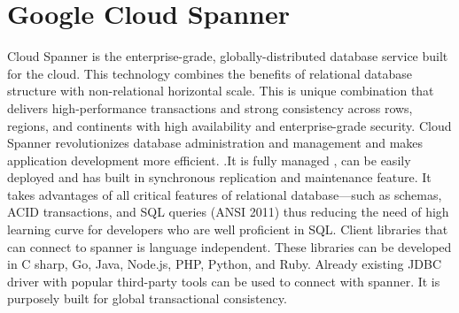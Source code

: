 \section{Google Cloud Spanner}

Cloud Spanner is the enterprise-grade, globally-distributed database service built for the cloud\cite{www-google-spanner}. This technology combines the benefits of relational database structure with non-relational horizontal scale. This is unique combination that delivers high-performance transactions and strong consistency across rows, regions, and continents with high availability and enterprise-grade security\cite{www-google-spanner}. Cloud Spanner revolutionizes database administration and management and makes application development more efficient. \cite{www-google-spanner}.It is fully managed , can be easily deployed and has built in synchronous replication and maintenance feature\cite{www-google-spanner}. It takes advantages of all critical features of relational database—such as schemas, ACID transactions, and SQL queries (ANSI 2011) thus reducing the need of high learning curve for developers who are well proficient in SQL. Client libraries that can connect to spanner is language independent. These libraries can be developed in C sharp, Go, Java, Node.js, PHP, Python, and Ruby. Already existing JDBC driver with popular third-party tools can be used to connect with spanner\cite{www-google-spanner}. It is purposely built for global transactional consistency\cite{www-google-spanner}.
